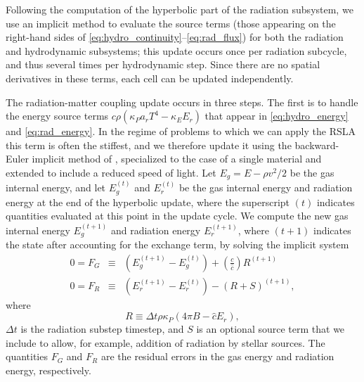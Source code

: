 \documentclass[fleqn,usenatbib]{mnras}
\begin{document}
Following the computation of the hyperbolic part of the radiation subsystem, we use an implicit method to evaluate the source terms (those appearing on the right-hand sides of \autoref{eq:hydro_continuity}--\autoref{eq:rad_flux}) for both the radiation and hydrodynamic subsystems; this update occurs once per radiation subcycle, and thus several times per hydrodynamic step. Since there are no spatial derivatives in these terms, each cell can be updated independently.

The radiation-matter coupling update occurs in three steps. The first is to handle the energy source terms $c\rho (\kappa_P a_r T^4 - \kappa_E E_r)$ that appear in \autoref{eq:hydro_energy} and \autoref{eq:rad_energy}. In the regime of problems to which we can apply the RSLA this term is often the stiffest, and we therefore update it using the backward-Euler implicit method of \cite{Howell_2003}, specialized to the case of a single material and extended to include a reduced speed of light. Let $E_g = E - \rho v^2/2$ be the gas internal energy, and let $E_g^{(t)}$ and $E_r^{(t)}$ be the gas internal energy and radiation energy at the end of the hyperbolic update, where the superscript $(t)$ indicates quantities evaluated at this point in the update cycle. We compute the new gas internal energy $E_g^{(t+1)}$ and radiation energy $E_r^{(t+1)}$, where $(t+1)$ indicates the state after accounting for the exchange term, by solving the implicit system
\begin{eqnarray}
0 = F_G &\equiv &(E_g^{(t+1)} - E_g^{(t)}) + \left( \frac{c}{\hat c} \right) R^{(t+1)} \\
0 = F_R &\equiv & (E_{r}^{(t+1)} - E_{r}^{(t)}) - \left( R + S \right)^{(t+1)},
\end{eqnarray}
where 
\begin{equation}
R \equiv \Delta t \rho \kappa_P (4 \pi B - \hat c E_r),
\end{equation}
$\Delta t$ is the radiation substep timestep, and $S$ is an optional source term that we include to allow, for example, addition of radiation by stellar sources. The quantities $F_G$ and $F_R$ are the residual errors in the gas energy and radiation energy, respectively.
\end{document}
